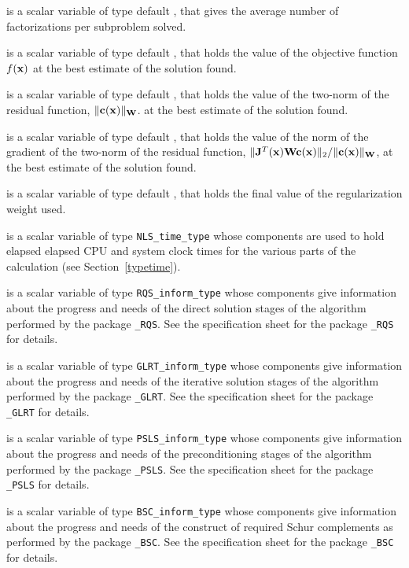 \documentclass{galahad}
\newcommand{\packagename}{NLS}
\begin{document}
\begin{description}
 is a scalar variable of type default \realdp, that
gives the average number of factorizations per subproblem solved.

 is a scalar variable of type default \realdp, that holds the
value of the objective function $f({\mathbf{x}})$  at the best estimate
of the solution found.

 is a scalar variable of type default \realdp, that holds the
value of the two-norm of the residual function, $\|{\mathbf{c}}({\mathbf{x}})\|_{{\mathbf{W}}}$.
at the best estimate of the solution found.

 is a scalar variable of type default \realdp, that holds the
value of the norm of the gradient of the two-norm of the residual function,
$\|{\mathbf{J}}^T({\mathbf{x}}) {\mathbf{W}} {\mathbf{c}}({\mathbf{x}})\|_2/\|{\mathbf{c}}({\mathbf{x}})\|_{{\mathbf{W}}}$, at the best estimate
of the solution found.

 is a scalar variable of type default \realdp, that holds the
final value of the regularization weight used.

 is a scalar variable of type {\tt \packagename\_time\_type}
whose components are used to hold elapsed elapsed CPU and system clock
times for the various parts of the calculation (see Section~\ref{typetime}).

 is a scalar variable of type
{\tt RQS\_inform\_type}
whose components give information about the progress and needs
of the direct solution stages of the algorithm performed by the package
{\tt \libraryname\_RQS}.
See the specification sheet for the package
{\tt \libraryname\_RQS}
for details.

 is a scalar variable of type
{\tt GLRT\_inform\_type}
whose components give information about the progress and needs
of the iterative solution stages of the algorithm performed by the package
{\tt \libraryname\_GLRT}.
See the specification sheet for the package
{\tt \libraryname\_GLRT}
for details.

 is a scalar variable of type
{\tt PSLS\_inform\_type}
whose components give information about the progress and needs
of the preconditioning stages of the algorithm performed by the package
{\tt \libraryname\_PSLS}.
See the specification sheet for the package
{\tt \libraryname\_PSLS} for details.

 is a scalar variable of type
{\tt BSC\_inform\_type}
whose components give information about the progress and needs
of the construct of required Schur complements
as performed by the package
{\tt \libraryname\_BSC}.
See the specification sheet for the package
{\tt \libraryname\_BSC} for details.


\end{description}
\end{document}
